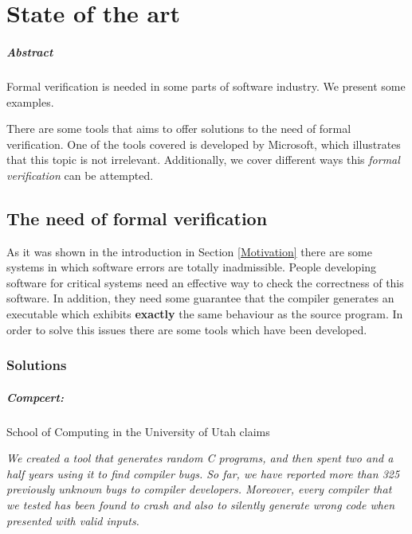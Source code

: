\chapter{State of the art\label{sec:estado_del_arte}}

\paragraph{Abstract}

Formal verification is needed in some parts of software industry. 
%
We present some examples.

There are some tools that aims to offer solutions to the need of formal verification. 
%
One of the tools covered is developed by Microsoft, which illustrates that this topic is not irrelevant.
%
Additionally, we cover different ways this \textit{formal verification} can be attempted.



\section{The need of formal verification}

As it was shown in the introduction  in Section \ref{Motivation} there are some systems in which software errors are totally inadmissible.
%
People developing software for critical systems need an effective way to check the correctness of this software.
%
In addition, they need some guarantee that the compiler generates an executable which exhibits \textbf{exactly} the same behaviour as the source program.
%
In order to solve this issues there are some tools which have been developed.

\subsection{Solutions}

\paragraph{Compcert:}
School of Computing in the University of Utah claims \cite{CCompilerMotivation}

\textit{We created a tool that generates random C programs, and then spent two and a half years using it to find compiler bugs. So far, we have reported more than 325 previously unknown bugs to compiler developers. Moreover, every compiler that we tested has been found to crash and also to silently generate wrong code when presented with valid inputs.}

